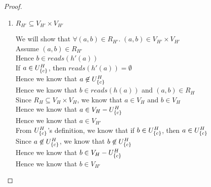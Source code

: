 \begin{proof}
\begin{enumerate}
\item $R_{H'} \subseteq V_{H'} \times V_{H'}$
  \begin{tabbedproof}
    \oo We will show that $\forall (a,b) \in R_{H'}.\; (a,b) \in V_{H'} \times V_{H'}$ \\ 
    \oo Assume $(a,b) \in R_{H'}$ \\
    \oo Hence $b \in \mathit{reads}(h'(a))$ \\
    \oo If $a \in U^H_{\{{c}\}}$, then $\mathit{reads}(h'(a)) = \emptyset$ \\ 
    \oo Hence we know that $a \not\in U^H_{\{{c}\}}$ \\
    \oo Hence we know that $b \in \mathit{reads}(h(a))$ and $(a,b) \in R_H$\\
    \oo Since $R_H \subseteq V_H \times V_H$,  we know that $a \in V_H$ and $b \in V_H$\\
    \oo Hence we know that $a \in V_H - U^H_{\{{c}\}}$ \\
    \oo Hence we know that $a \in V_{H'}$ \\
    \oo From $U^H_{\{{c}\}}$'s definition, we know that if $b \in U^H_{\{{c}\}}$, then $a \in U^H_{\{{c}\}}$ \\
    \oo Since $a \not\in U^H_{\{{c}\}}$, we know that $b \not\in U^H_{\{{c}\}}$ \\
    \oo Hence we know that $b \in V_H - U^H_{\{{c}\}}$ \\
    \oo Hence we know that $b \in V_{H'}$ 
  \end{tabbedproof}


\end{enumerate}
\end{proof}
